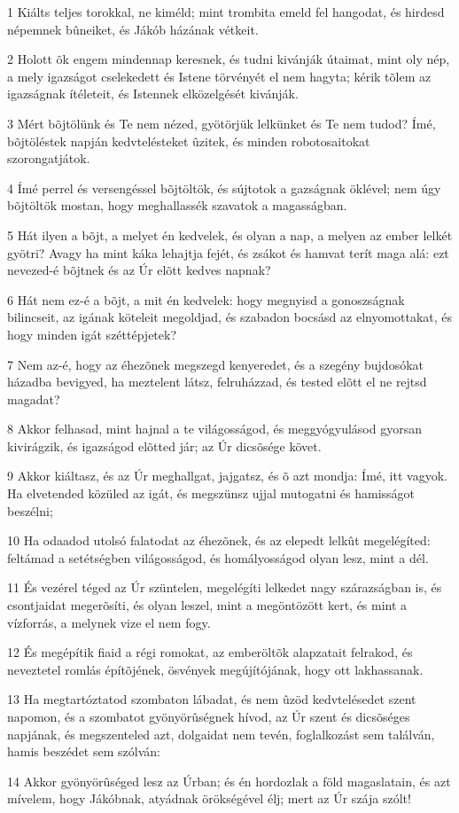 \par 1 Kiálts teljes torokkal, ne kiméld; mint trombita emeld fel hangodat, és hirdesd népemnek bûneiket, és Jákób házának vétkeit.
\par 2 Holott õk engem mindennap keresnek, és tudni kivánják útaimat, mint oly nép, a mely igazságot cselekedett és Istene törvényét el nem hagyta; kérik tõlem az igazságnak ítéleteit, és Istennek elközelgését kivánják.
\par 3 Mért bõjtölünk és Te nem nézed, gyötörjük lelkünket és Te nem tudod? Ímé, bõjtöléstek napján kedvtelésteket ûzitek, és minden robotosaitokat szorongatjátok.
\par 4 Ímé perrel és versengéssel bõjtöltök, és sújtotok a gazságnak öklével; nem úgy bõjtöltök mostan, hogy meghallassék szavatok a magasságban.
\par 5 Hát ilyen a bõjt, a melyet én kedvelek, és olyan a nap, a melyen az ember lelkét gyötri? Avagy ha mint káka lehajtja fejét, és zsákot és hamvat terít maga alá: ezt nevezed-é bõjtnek és az Úr elõtt kedves napnak?
\par 6 Hát nem ez-é a bõjt, a mit én kedvelek: hogy megnyisd a gonoszságnak bilincseit, az igának köteleit megoldjad, és szabadon bocsásd az elnyomottakat, és hogy minden igát széttépjetek?
\par 7 Nem az-é, hogy az éhezõnek megszegd kenyeredet, és a szegény bujdosókat házadba bevigyed, ha meztelent látsz, felruházzad, és tested elõtt el ne rejtsd magadat?
\par 8 Akkor felhasad, mint hajnal a te világosságod, és meggyógyulásod gyorsan kivirágzik, és igazságod elõtted jár; az Úr dicsõsége követ.
\par 9 Akkor kiáltasz, és az Úr meghallgat, jajgatsz, és õ azt mondja: Ímé, itt vagyok. Ha elvetended közüled az igát, és megszünsz ujjal mutogatni és hamisságot beszélni;
\par 10 Ha odaadod utolsó falatodat az éhezõnek, és az elepedt lelkût megelégíted: feltámad a setétségben világosságod, és homályosságod olyan lesz, mint a dél.
\par 11 És vezérel téged az Úr szüntelen, megelégíti lelkedet nagy szárazságban is, és csontjaidat megerõsíti, és olyan leszel, mint a megöntözött kert, és mint a vízforrás, a melynek vize el nem fogy.
\par 12 És megépítik fiaid a régi romokat, az emberöltõk alapzatait felrakod, és neveztetel romlás építõjének, ösvények megújítójának, hogy ott lakhassanak.
\par 13 Ha megtartóztatod szombaton lábadat, és nem ûzöd kedvtelésedet szent napomon, és a szombatot gyönyörûségnek hívod, az Úr szent és dicsõséges napjának, és megszenteled azt, dolgaidat nem tevén, foglalkozást sem találván, hamis beszédet sem szólván:
\par 14 Akkor gyönyörûséged lesz az Úrban; és én hordozlak a föld magaslatain, és azt mívelem, hogy Jákóbnak, atyádnak örökségével élj; mert az Úr szája szólt!

